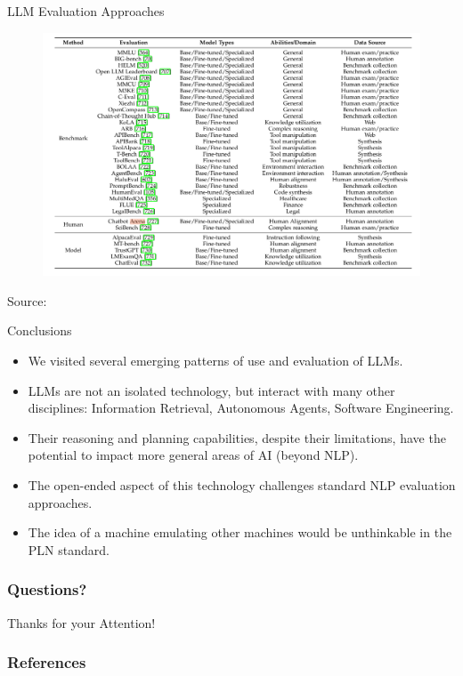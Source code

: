 \documentclass[handout]{beamer}
\begin{document}
\begin{frame}{LLM Evaluation Approaches}
\tiny
      \begin{figure}[h]
       	\includegraphics[scale = 0.23]{pics/LLMbenchmarks.png}
      \end{figure}

Source: \cite{zhao2023survey}
\end{frame}



\begin{frame}{Conclusions}
\begin{scriptsize}
\begin{itemize}
 \item We visited several emerging patterns of use and evaluation of LLMs.
 \item LLMs are not an isolated technology, but interact with many other disciplines: Information Retrieval, Autonomous Agents, Software Engineering.
 \item Their reasoning and planning capabilities, despite their limitations, have the potential to impact more general areas of AI (beyond NLP).
 \item The open-ended aspect of this technology challenges standard NLP evaluation approaches.
 \item The idea of a machine emulating other machines would be unthinkable in the PLN standard.
\end{itemize}
\end{scriptsize}
\end{frame}

\begin{frame}
\frametitle{Questions?}
\begin{center}\LARGE Thanks for your Attention!\\ \end{center}



\end{frame}

\begin{frame}[allowframebreaks]\scriptsize
\frametitle{References}


%
\end{frame}  


\end{document}
